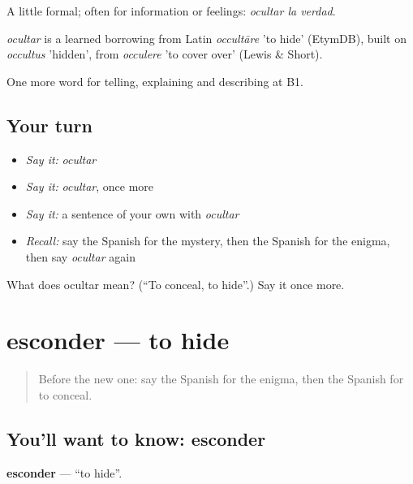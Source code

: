 A little formal; often for information or feelings: \emph{ocultar la verdad}.

\begin{cousinweb}
\emph{ocultar} is a learned borrowing from Latin \emph{occultāre} 'to hide' (EtymDB), built on \emph{occultus} 'hidden', from \emph{occulere} 'to cover over' (Lewis \& Short).
\end{cousinweb}

\begin{grammarlens}[title={What you've built}]
One more word for telling, explaining and describing at B1.
\end{grammarlens}

\subsection*{Your turn}
\begin{itemize}
\raggedright
  \item \emph{Say it:} \emph{ocultar}
  \item \emph{Say it:} \emph{ocultar}, once more
  \item \emph{Say it:} a sentence of your own with \emph{ocultar}
  \item \emph{Recall:} say the Spanish for the mystery, then the Spanish for the enigma, then say \emph{ocultar} again
\end{itemize}

\begin{tcolorbox}[breakable,colback=teal!4,colframe=teal!35!black,title={Before you move on}]
What does ocultar mean? (\textquotedblleft{}To conceal, to hide\textquotedblright{}.) Say it once more.
\end{tcolorbox}
\section[esconder]{esconder — to hide}

\label{lesson:ES-C532-esconder}



\begin{quote}
Before the new one: say the Spanish for the enigma, then the Spanish for to conceal.
\end{quote}

\subsection*{You'll want to know: esconder}
\textbf{esconder} — \textquotedblleft{}to hide\textquotedblright{}.

